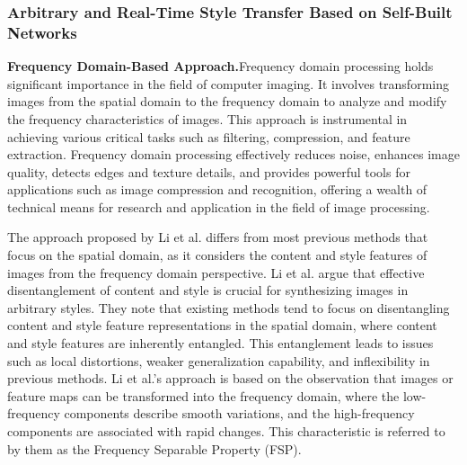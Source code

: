 \documentclass[preprint,12pt]{elsarticle}
\begin{document}
\subsubsection{Arbitrary and Real-Time Style Transfer Based on Self-Built Networks}

\textbf{Frequency Domain-Based Approach.}\quad Frequency domain processing holds significant importance in the field of computer imaging. It involves transforming images from the spatial domain to the frequency domain to analyze and modify the frequency characteristics of images. This approach is instrumental in achieving various critical tasks such as filtering, compression, and feature extraction. Frequency domain processing effectively reduces noise, enhances image quality, detects edges and texture details, and provides powerful tools for applications such as image compression and recognition, offering a wealth of technical means for research and application in the field of image processing.

The approach proposed by Li et al.\citep{03li2023frequency} differs from most previous methods \citep{04huang2017arbitrary,40chen2017stylebank,50li2023compact,55zhu2023all,68zitnick2014adopting,69zhang2017style} that focus on the spatial domain, as it considers the content and style features of images from the frequency domain perspective. Li et al. argue that effective disentanglement of content and style is crucial for synthesizing images in arbitrary styles. They note that existing methods tend to focus on disentangling content and style feature representations in the spatial domain, where content and style features are inherently entangled. This entanglement leads to issues such as local distortions, weaker generalization capability, and inflexibility in previous methods. Li et al.’s approach is based on the observation that images or feature maps can be transformed into the frequency domain, where the low-frequency components describe smooth variations, and the high-frequency components are associated with rapid changes\citep{70chen2019drop}. This characteristic is referred to by them as the Frequency Separable Property (FSP).
\end{document}
